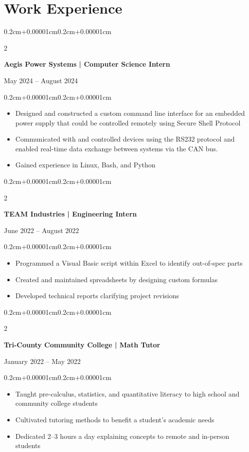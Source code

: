 \documentclass[10pt, letterpaper]{article}
\newenvironment{highlights}{
  \begin{itemize}[topsep=0.10cm,parsep=0.10cm,partopsep=0pt,itemsep=0pt,leftmargin=0.4cm+10pt]
}{\end{itemize}}
\newenvironment{onecolentry}{
  \begin{adjustwidth}{0.2cm+0.00001cm}{0.2cm+0.00001cm}
}{\end{adjustwidth}}
\newenvironment{twocolentry}[2][]{
  \onecolentry
  \def\secondColumn{#2}
  \setcolumnwidth{\fill,4.5cm}
  \begin{paracol}{2}
}{
  \switchcolumn \raggedleft \secondColumn
  \end{paracol}
  \endonecolentry
}
\begin{document}
\section{Work Experience}
\begin{twocolentry}{May 2024 -- August 2024}
\textbf{Aegis Power Systems | Computer Science Intern}
\end{twocolentry}
\begin{onecolentry}
\begin{highlights}
  \item[$\vartriangleright$] Designed and constructed a custom command line interface for an embedded power supply that could be controlled remotely using Secure Shell Protocol
  \item[$\vartriangleright$] Communicated with and controlled devices using the RS232 protocol and enabled real-time data exchange between systems via the CAN bus.
  \item[$\vartriangleright$] Gained experience in Linux, Bash, and Python
\end{highlights}
\end{onecolentry}

\begin{twocolentry}{June 2022 -- August 2022}
\textbf{TEAM Industries | Engineering Intern}
\end{twocolentry}
\begin{onecolentry}
\begin{highlights}
  \item[$\vartriangleright$] Programmed a Visual Basic script within Excel to identify out-of-spec parts
  \item[$\vartriangleright$] Created and maintained spreadsheets by designing custom formulas
  \item[$\vartriangleright$] Developed technical reports clarifying project revisions
\end{highlights}
\end{onecolentry}

\begin{twocolentry}{January 2022 -- May 2022}
\textbf{Tri-County Community College | Math Tutor}
\end{twocolentry}
\begin{onecolentry}
\begin{highlights}
  \item[$\vartriangleright$] Taught pre-calculus, statistics, and quantitative literacy to high school and community college students
  \item[$\vartriangleright$] Cultivated tutoring methods to benefit a student's academic needs
  \item[$\vartriangleright$] Dedicated 2--3 hours a day explaining concepts to remote and in-person students
\end{highlights}
\end{onecolentry}
\end{document}
